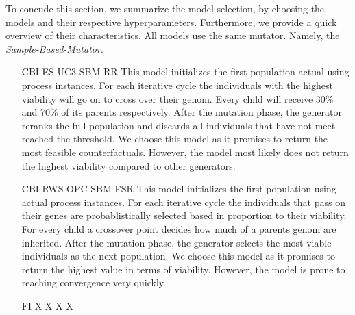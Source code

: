 \documentclass[./../../paper.tex]{subfiles}
\begin{document}
To concude this section, we summarize the model selection, by choosing the models and their respective hyperparameters. Furthermore, we provide a quick overview of their characteristics. All models use the same mutator. Namely, the \emph{Sample-Based-Mutator}. 


\begin{enumerate}
    \item[CBI-ES-UC3-SBM-RR] This model initializes the first population actual using process instances. For each iterative cycle the individuals with the highest viability will go on to cross over their genom. Every child will receive 30\% and 70\% of its parents respectively. After the mutation phase, the generator reranks the full population and discards all individuals that have not meet reached the threshold. We choose this model as it promises to return the most feasible counterfactuals. However, the model most likely does not return the highest viability compared to other generators.
    \item[CBI-RWS-OPC-SBM-FSR] This model initializes the first population using actual process instances. For each iterative cycle the individuals that pass on their genes are probablistically selected based in proportion to their viability. For every child a crossover point decides how much of a parents genom are inherited. After the mutation phase, the generator selects the most viable individuals as the next population. We choose this model as it promises to return the highest value in terms of viability. However, the model is prone to reaching convergence very quickly.  
    \item[FI-X-X-X-X]   
\end{enumerate}

\end{document}
